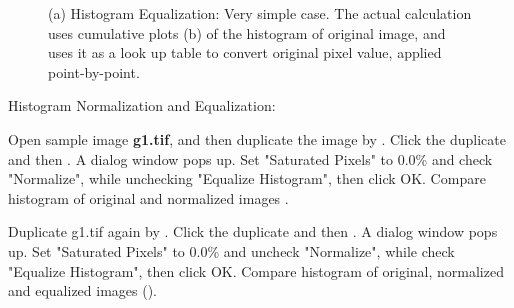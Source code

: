 \begin{figure}[H]
 \centering
 \caption{ (a) Histogram Equalization: Very simple case.
The actual calculation uses cumulative plots (b) of the histogram of original
image, and uses it as a look up table to convert original pixel value,
applied point-by-point. }
 \label{fig:equalizationSimple}
\end{figure}

\begin{indentexercise}{2}
Histogram Normalization and Equalization:
\item Open sample image \textbf{g1.tif}, and then duplicate the image by
. Click the duplicate and then . A dialog window pops up. Set "Saturated Pixels" to 0.0\% and check "Normalize", while unchecking "Equalize Histogram", then click OK.
Compare histogram of original and normalized images .  

\item Duplicate g1.tif again by . Click the
duplicate and then . A dialog window pops up. Set "Saturated
Pixels" to 0.0\% and uncheck "Normalize", while check "Equalize Histogram", then click OK.
Compare histogram of original, normalized and equalized images
().

\end{indentexercise}

